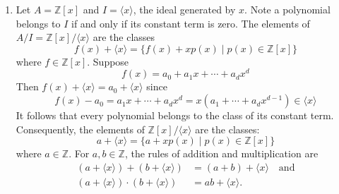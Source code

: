 \documentclass[11pt,a4paper]{article}
\begin{document}
\begin{exa}
\begin{enumerate}[label=(\roman*)]
\item Let \( A = \mathbb{Z}[x] \) and \( I = \langle x \rangle \), the ideal generated by \( x \). Note a polynomial belongs to \( I \) if and only if its constant term is zero. The elements of \( A / I = \mathbb{Z}[x] / \langle x \rangle \) are the classes
\[
f(x) + \langle x \rangle = \{f(x) + xp(x) \mid p(x) \in \mathbb{Z}[x]\}
\]
where \( f \in \mathbb{Z}[x] \). Suppose
\[
f(x) = a_0 + a_1x + \cdots + a_d x^d
\]
Then \( f(x) + \langle x \rangle = a_0 + \langle x \rangle \) since
\[
f(x) - a_0 = a_1x + \cdots + a_d x^d = x\left(a_1 + \cdots + a_d x^{d-1}\right) \in \langle x \rangle
\]
It follows that every polynomial belongs to the class of its constant term. Consequently, the elements of \( \mathbb{Z}[x] / \langle x \rangle \) are the classes:
\[
a + \langle x \rangle = \{a + xp(x) \mid p(x) \in \mathbb{Z}[x]\}
\]
where \( a \in \mathbb{Z} \). For \( a, b \in \mathbb{Z} \), the rules of addition and multiplication are
\begin{align*}
(a + \langle x \rangle) + (b + \langle x \rangle) &= (a + b) + \langle x \rangle\quad\text{and}\\
(a + \langle x \rangle) \cdot (b + \langle x \rangle) &= ab + \langle x \rangle.
\end{align*}


\end{enumerate}
\end{exa}
\end{document}
